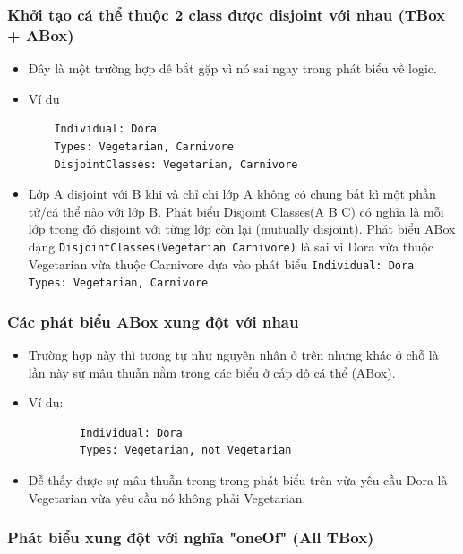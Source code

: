 \subsubsection{Khởi tạo cá thể thuộc 2 class được disjoint với nhau (TBox + ABox)}
\begin{itemize}
	\item
	Đây là một trường hợp dễ bắt gặp vì nó sai ngay trong phát biểu về logic.
	\item Ví dụ
	\begin{verbatim}
	Individual: Dora
	Types: Vegetarian, Carnivore
	DisjointClasses: Vegetarian, Carnivore
	\end{verbatim}
	\item
	Lớp A disjoint với B khi và chỉ chi lớp A không có chung bất kì một phần tử/cá thể nào với lớp B. Phát biểu Disjoint Classes(A B C) có nghĩa là mỗi lớp trong đó disjoint với từng lớp còn lại (mutually disjoint). Phát biểu ABox dạng \texttt{DisjointClasses(Vegetarian Carnivore)} là sai vì Dora vừa thuộc Vegetarian vừa thuộc Carnivore dựa vào phát biểu \texttt{Individual: Dora Types: Vegetarian, Carnivore}.
\end{itemize}  	
\subsubsection{Các phát biểu ABox xung đột với nhau}
\begin{itemize} 
	\item{Trường hợp này thì tương tự như nguyên nhân ở trên nhưng khác ở chỗ là lần này sự mâu thuẫn nằm trong các biểu ở cấp độ cá thể (ABox).}
	\item{Ví dụ:	
		\begin{verbatim}
		Individual: Dora
		Types: Vegetarian, not Vegetarian
		\end{verbatim}
	}
	\item{Dễ thấy được sự mâu thuẫn trong trong phát biểu trên vừa yêu cầu Dora là Vegetarian vừa yêu cầu nó không phải Vegetarian.}
\end{itemize}
\subsubsection{Phát biểu xung đột với nghĩa "oneOf" (All TBox)}

